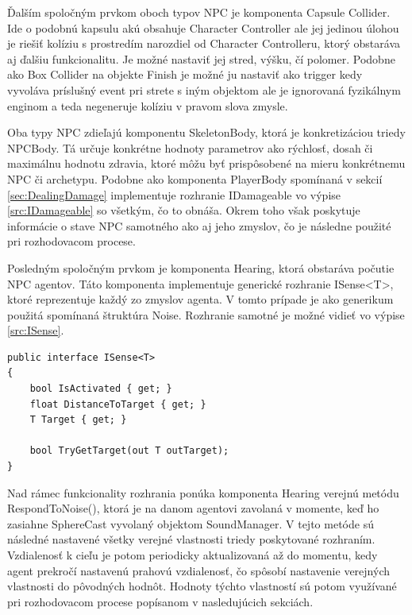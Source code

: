 \documentclass[slovak, master]{diploma}
\begin{document}
Ďalším spoločným prvkom oboch typov NPC je komponenta Capsule Collider. Ide o podobnú kapsulu akú obsahuje Character Controller ale jej jedinou úlohou je riešiť kolíziu s prostredím narozdiel od Character Controlleru, ktorý obstaráva aj ďalšiu funkcionalitu. Je možné nastaviť jej stred, výšku, čí polomer. Podobne ako Box Collider na objekte Finish je možné ju nastaviť ako trigger kedy vyvoláva príslušný event pri strete s iným objektom ale je ignorovaná fyzikálnym enginom a teda negeneruje kolíziu v pravom slova zmysle.

Oba typy NPC zdieľajú komponentu SkeletonBody, ktorá je konkretizáciou triedy NPCBody. Tá určuje konkrétne hodnoty parametrov ako rýchlosť, dosah či maximálnu hodnotu zdravia, ktoré môžu byť prispôsobené na mieru konkrétnemu NPC či archetypu. Podobne ako komponenta PlayerBody spomínaná v sekcií \ref{sec:DealingDamage} implementuje rozhranie IDamageable vo výpise \ref{src:IDamageable} so všetkým, čo to obnáša. Okrem toho však poskytuje informácie o stave NPC samotného ako aj jeho zmyslov, čo je následne použité pri rozhodovacom procese.

Posledným spoločným prvkom je komponenta Hearing, ktorá obstaráva počutie NPC agentov. Táto komponenta implementuje generické rozhranie ISense<T>, ktoré reprezentuje každý zo zmyslov agenta. V tomto prípade je ako generikum použitá spomínaná štruktúra Noise. Rozhranie samotné je možné vidieť vo výpise \ref{src:ISense}.

\vspace{8pt}
\begin{lstlisting}[label=src:ISense,caption={Generické rozhranie ISense}]
public interface ISense<T>
{
    bool IsActivated { get; }
    float DistanceToTarget { get; }
    T Target { get; }

    bool TryGetTarget(out T outTarget);
}
\end{lstlisting}

Nad rámec funkcionality rozhrania ponúka komponenta Hearing verejnú metódu RespondToNoise(), ktorá je na danom agentovi zavolaná v momente, keď ho zasiahne SphereCast vyvolaný objektom SoundManager. V tejto metóde sú následné nastavené všetky verejné vlastnosti triedy poskytované rozhraním. Vzdialenosť k cieľu je potom periodicky aktualizovaná až do momentu, kedy agent prekročí nastavenú prahovú vzdialenosť, čo spôsobí nastavenie verejných vlastnosti do pôvodných hodnôt. Hodnoty týchto vlastností sú potom využívané pri rozhodovacom procese popísanom v nasledujúcich sekciách.
\end{document}
